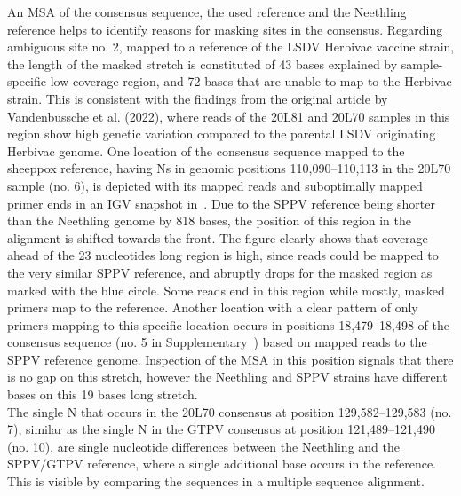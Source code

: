An \ac{MSA} of the consensus sequence, the used reference and the Neethling reference helps to identify reasons for masking sites in the consensus. Regarding ambiguous site no. 2, mapped to a reference of the \ac{LSDV} Herbivac vaccine strain, the length of the masked stretch is constituted of 43 bases explained by sample-specific low coverage region, and 72 bases that are unable to map to the Herbivac strain. This is consistent with the findings from the original article by Vandenbussche et al. (2022), where reads of the 20L81 and 20L70 samples in this region show high genetic variation compared to the parental \ac{LSDV} originating Herbivac genome. One location of the consensus sequence mapped to the sheeppox reference, having Ns in genomic positions 110,090--110,113 in the 20L70 sample (no. 6), is depicted with its mapped reads and suboptimally mapped primer ends in an \ac{IGV} snapshot in~. Due to the \ac{SPPV} reference being shorter than the Neethling genome by 818 bases, the position of this region in the alignment is shifted towards the front. The figure clearly shows that coverage ahead of the 23 nucleotides long region is high, since reads could be mapped to the very similar \ac{SPPV} reference, and abruptly drops for the masked region as marked with the blue circle. Some reads end in this region while mostly, masked primers map to the reference. Another location with a clear pattern of only primers mapping to this specific location occurs in positions 18,479--18,498 of the consensus sequence (no. 5 in Supplementary~) based on mapped reads to the \ac{SPPV} reference genome. Inspection of the \ac{MSA} in this position signals that there is no gap on this stretch, however the Neethling and \ac{SPPV} strains have different bases on this 19 bases long stretch.\\
The single N that occurs in the 20L70 consensus at position 129,582--129,583 (no. 7), similar as the single N in the \ac{GTPV} consensus at position 121,489--121,490 (no. 10), are single nucleotide differences between the Neethling and the \ac{SPPV}/\ac{GTPV} reference, where a single additional base occurs in the reference. This is visible by comparing the sequences in a multiple sequence alignment.\\
